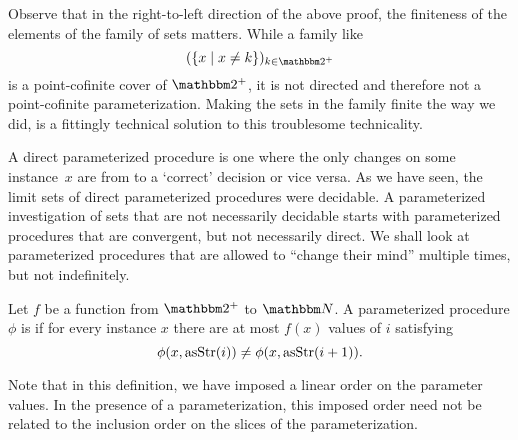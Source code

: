 Observe that in the right-to-left direction of the above proof, the finiteness of the elements of the family of sets matters.
While a family like
\begin{equation*}
  (\{x \st x \neq k\})_{k \in \binary^+}
\end{equation*}
is a point-cofinite cover of $\binary^+$, it is not directed and therefore not a point-cofinite parameterization.
Making the sets in the family finite the way we did, is a fittingly technical solution to this troublesome technicality.

A direct parameterized procedure is one where the only changes on some instance~$x$ are from  to a `correct' decision or vice versa.
As we have seen, the limit sets of direct parameterized procedures were decidable.
A parameterized investigation of sets that are not necessarily decidable starts with parameterized procedures that are convergent, but not necessarily direct.
We shall look at parameterized procedures that are allowed to \enquote{change their mind} multiple times, but not indefinitely.
\begin{definition}
  Let $f$ be a function from $\binary^+$ to $\bbN$.
  A parameterized procedure $\phi$ is  if for every instance $x$ there are at most $f(x)$ values of $i$ satisfying
  \begin{equation*}
    \phi(x, \operatorname{asStr}(i)) \neq \phi(x, \operatorname{asStr}(i + 1)).
  \end{equation*}
\end{definition}

Note that in this definition, we have imposed a linear order on the parameter values.
In the presence of a parameterization, this imposed order need not be related to the inclusion order on the slices of the parameterization.

